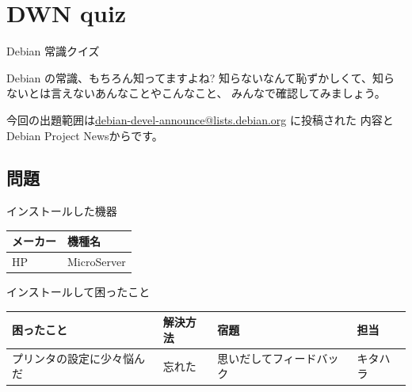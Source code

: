 
\section{DWN quiz}
\begin{frame}{Debian 常識クイズ}

Debian の常識、もちろん知ってますよね?
知らないなんて恥ずかしくて、知らないとは言えないあんなことやこんなこと、
みんなで確認してみましょう。

今回の出題範囲は\url{debian-devel-announce@lists.debian.org} に投稿された
内容とDebian Project Newsからです。

\end{frame}

\subsection{問題}





{\footnotesize
 
}

\begin{frame}{インストールした機器}
\begin{table}[ht]
 \begin{center}
  \begin{tabular}{|l|l|}
   \hline
   メーカー & 機種名 \\
   \hline
   HP & MicroServer  \\
   \hline
  \end{tabular}
 \end{center}
\end{table}
\end{frame}

\begin{frame}{インストールして困ったこと}

\begin{table}[ht]
 \begin{center}
  \begin{tabular}{|p{7em}|p{4em}|p{7em}|p{4em}|}
   \hline
   困ったこと & 解決方法 & 宿題 & 担当 \\
   \hline
   プリンタの設定に少々悩んだ & 忘れた & 思いだしてフィードバック & キタハラ\\
   \hline
  \end{tabular}
 \end{center}
\end{table}

\end{frame}

